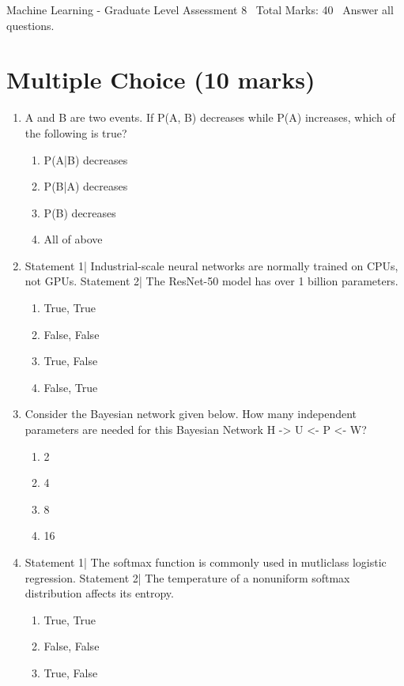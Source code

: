 \documentclass[12pt]{article}
\begin{document}
\begin{center}
Machine Learning - Graduate Level Assessment 8 \
Total Marks: 40 \
Answer all questions.
\end{center}

\section*{Multiple Choice (10 marks)}
\begin{enumerate}[label=\arabic*.]
\item A and B are two events. If P(A, B) decreases while P(A) increases, which of the following is true?
\begin{enumerate}[label=(\alph*)]
    \item P(A|B) decreases
    \item P(B|A) decreases
    \item P(B) decreases
    \item All of above
\end{enumerate}
\item Statement 1| Industrial-scale neural networks are normally trained on CPUs, not GPUs. Statement 2| The ResNet-50 model has over 1 billion parameters.
\begin{enumerate}[label=(\alph*)]
    \item True, True
    \item False, False
    \item True, False
    \item False, True
\end{enumerate}
\item Consider the Bayesian network given below. How many independent parameters are needed for this Bayesian Network H -\textgreater{} U \textless{}- P \textless{}- W?
\begin{enumerate}[label=(\alph*)]
    \item 2
    \item 4
    \item 8
    \item 16
\end{enumerate}
\item Statement 1| The softmax function is commonly used in mutliclass logistic regression. Statement 2| The temperature of a nonuniform softmax distribution affects its entropy.
\begin{enumerate}[label=(\alph*)]
    \item True, True
    \item False, False
    \item True, False

\end{enumerate}
\end{enumerate}
\end{document}
